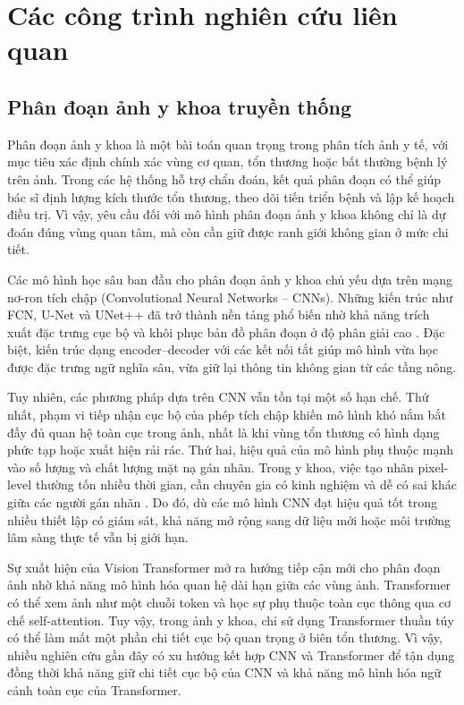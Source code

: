 \chapter{Các công trình nghiên cứu liên quan}
\label{Chapter2}
\setcounter{secnumdepth}{5}

\section{Phân đoạn ảnh y khoa truyền thống}

Phân đoạn ảnh y khoa là một bài toán quan trọng trong phân tích ảnh y tế, với mục tiêu xác định chính xác vùng cơ quan, tổn thương hoặc bất thường bệnh lý trên ảnh. Trong các hệ thống hỗ trợ chẩn đoán, kết quả phân đoạn có thể giúp bác sĩ định lượng kích thước tổn thương, theo dõi tiến triển bệnh và lập kế hoạch điều trị. Vì vậy, yêu cầu đối với mô hình phân đoạn ảnh y khoa không chỉ là dự đoán đúng vùng quan tâm, mà còn cần giữ được ranh giới không gian ở mức chi tiết.

Các mô hình học sâu ban đầu cho phân đoạn ảnh y khoa chủ yếu dựa trên mạng nơ-ron tích chập (Convolutional Neural Networks -- CNNs). Những kiến trúc như FCN, U-Net và UNet++ đã trở thành nền tảng phổ biến nhờ khả năng trích xuất đặc trưng cục bộ và khôi phục bản đồ phân đoạn ở độ phân giải cao \cite{li_lvit_2023}. Đặc biệt, kiến trúc dạng encoder--decoder với các kết nối tắt giúp mô hình vừa học được đặc trưng ngữ nghĩa sâu, vừa giữ lại thông tin không gian từ các tầng nông.

Tuy nhiên, các phương pháp dựa trên CNN vẫn tồn tại một số hạn chế. Thứ nhất, phạm vi tiếp nhận cục bộ của phép tích chập khiến mô hình khó nắm bắt đầy đủ quan hệ toàn cục trong ảnh, nhất là khi vùng tổn thương có hình dạng phức tạp hoặc xuất hiện rải rác. Thứ hai, hiệu quả của mô hình phụ thuộc mạnh vào số lượng và chất lượng mặt nạ gán nhãn. Trong y khoa, việc tạo nhãn pixel-level thường tốn nhiều thời gian, cần chuyên gia có kinh nghiệm và dễ có sai khác giữa các người gán nhãn \cite{li_lvit_2023}. Do đó, dù các mô hình CNN đạt hiệu quả tốt trong nhiều thiết lập có giám sát, khả năng mở rộng sang dữ liệu mới hoặc môi trường lâm sàng thực tế vẫn bị giới hạn.

Sự xuất hiện của Vision Transformer mở ra hướng tiếp cận mới cho phân đoạn ảnh nhờ khả năng mô hình hóa quan hệ dài hạn giữa các vùng ảnh. Transformer có thể xem ảnh như một chuỗi token và học sự phụ thuộc toàn cục thông qua cơ chế self-attention. Tuy vậy, trong ảnh y khoa, chỉ sử dụng Transformer thuần túy có thể làm mất một phần chi tiết cục bộ quan trọng ở biên tổn thương. Vì vậy, nhiều nghiên cứu gần đây có xu hướng kết hợp CNN và Transformer để tận dụng đồng thời khả năng giữ chi tiết cục bộ của CNN và khả năng mô hình hóa ngữ cảnh toàn cục của Transformer.

